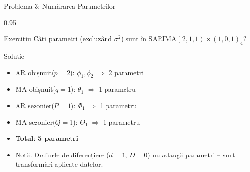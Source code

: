 \documentclass[9pt, aspectratio=169, t]{beamer}
\begin{document}
\begin{frame}{Problema 3: Numărarea Parametrilor}
    \begin{cminipage}{0.95\textwidth}
    \begin{block}{Exercițiu}
        Câți parametri (excluzând $\sigma^2$) sunt în SARIMA$(2,1,1) \times (1,0,1)_4$?
    \end{block}

    \vspace{0.3cm}
    \pause
    \begin{exampleblock}{Soluție}
        \begin{itemize}\setlength{\itemsep}{0pt}
            \item AR obișnuit($p=2$): $\phi_1, \phi_2$ $\Rightarrow$ 2 parametri
            \item MA obișnuit($q=1$): $\theta_1$ $\Rightarrow$ 1 parametru
            \item AR sezonier($P=1$): $\Phi_1$ $\Rightarrow$ 1 parametru
            \item MA sezonier($Q=1$): $\Theta_1$ $\Rightarrow$ 1 parametru
            \item \textbf{Total: 5 parametri}
            \item Notă: Ordinele de diferențiere ($d=1$, $D=0$) nu adaugă parametri -- sunt transformări aplicate datelor.
        \end{itemize}
    \end{exampleblock}
    \end{cminipage}
\end{frame}
\end{document}
